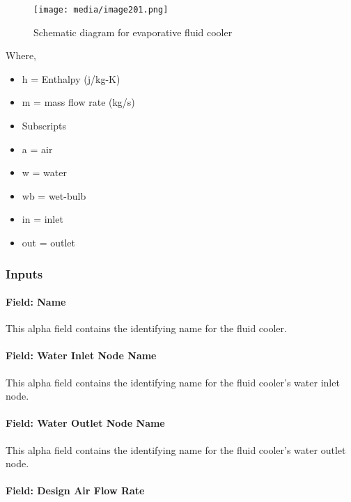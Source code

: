 \begin{figure}[hbtp] %
\centering
\texttt{[image: media/image201.png]}
\caption{Schematic diagram for evaporative fluid cooler \protect \label{fig:schematic-diagram-for-evaporative-fluid}}
\end{figure}

Where,

\begin{itemize}
\item
  h = Enthalpy (j/kg-K)
\item
  m = mass flow rate (kg/s)
\item
  Subscripts
\item
  a = air
\item
  w = water
\item
  wb = wet-bulb
\item
  in = inlet
\item
  out = outlet
\end{itemize}

\subsubsection{Inputs}\label{inputs-6-004}

\paragraph{Field: Name}\label{field-name-5-005}

This alpha field contains the identifying name for the fluid cooler.

\paragraph{Field: Water Inlet Node Name}\label{field-water-inlet-node-name-4}

This alpha field contains the identifying name for the fluid cooler's water inlet node.

\paragraph{Field: Water Outlet Node Name}\label{field-water-outlet-node-name-4}

This alpha field contains the identifying name for the fluid cooler's water outlet node.

\paragraph{Field: Design Air Flow Rate}\label{field-design-air-flow-rate-3}

